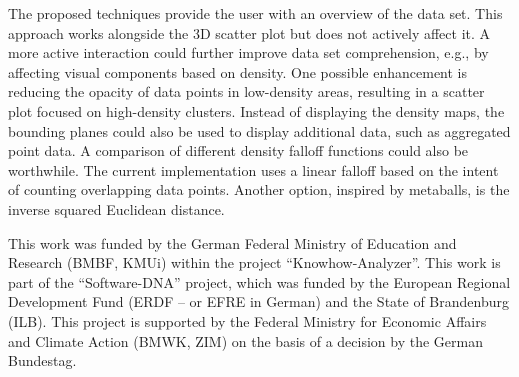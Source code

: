 \documentclass[sigconf]{acmart}
\begin{document}
The proposed techniques provide the user with an overview of the data set.
This approach works alongside the 3D scatter plot but does not actively affect it.
A more active interaction could further improve data set comprehension, e.g., by affecting visual components based on density.
One possible enhancement is reducing the opacity of data points in low-density areas, resulting in a scatter plot focused on high-density clusters.
Instead of displaying the density maps, the bounding planes could also be used to display additional data, such as aggregated point data.
A comparison of different density falloff functions could also be worthwhile.
The current implementation uses a linear falloff based on the intent of counting overlapping data points.
Another option, inspired by metaballs, is the inverse squared Euclidean distance.

\begin{acks}
This work was funded by the German Federal Ministry of Education and Research (BMBF, KMUi) within the project \enquote{Knowhow-Analyzer}.
This work is part of the \enquote{Software-DNA} project, which was funded by the European Regional Development Fund (ERDF -- or EFRE in German) and the State of Brandenburg (ILB).
This project is supported by the Federal Ministry for Economic Affairs and Climate Action (BMWK, ZIM) on the basis of a decision by the German Bundestag.
\end{acks}




\appendix
\end{document}
